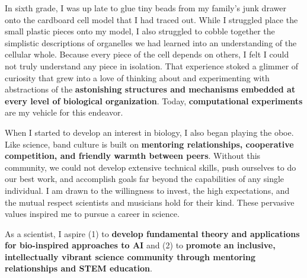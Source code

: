 In sixth grade, I was up late to glue tiny beads from my family's junk drawer onto the cardboard cell model that I had traced out.
While I struggled place the small plastic pieces onto my model, I also struggled to cobble together the simplistic descriptions of organelles we had learned into an understanding of the cellular whole.
Because every piece of the cell depends on others, I felt I could not truly understand any piece in isolation.
That experience stoked a glimmer of curiosity that grew into a love of thinking about and experimenting with abstractions of the \textbf{astonishing structures and mechanisms embedded at every level of biological organization}.
Today, \textbf{computational experiments} are my vehicle for this endeavor.

When I started to develop an interest in biology, I also began playing the oboe.
Like science, band culture is built on \textbf{mentoring relationships, cooperative competition, and friendly warmth between peers}.
Without this community, we could not develop extensive technical skills, push ourselves to do our best work, and accomplish goals far beyond the capabilities of any single individual.
I am drawn to the willingness to invest, the high expectations, and the mutual respect scientists and musicians hold for their kind.
These pervasive values inspired me to pursue a career in science.

As a scientist, I aspire
(1) to \textbf{develop fundamental theory and applications for bio-inspired approaches to AI} and
(2) to \textbf{promote an inclusive, intellectually vibrant science community through mentoring relationships and STEM education}.
